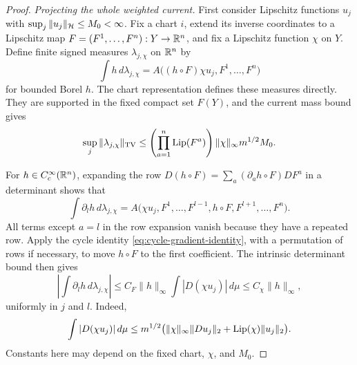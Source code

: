 \begin{proof}
\emph{Projecting the whole weighted current.}
First consider Lipschitz functions $u_j$ with
$\sup_j\|u_j\|_{\mathcal H}\le M_0<\infty$.  Fix a chart $i$, extend its
inverse coordinates to a Lipschitz map $F=(F^1,\ldots,F^n):Y\to\mathbb R^n$,
and fix a Lipschitz function $\chi$ on $Y$.  Define finite signed
measures $\lambda_{j,\chi}$ on $\mathbb R^n$ by
\begin{equation}
 \int h\,d\lambda_{j,\chi}
 =A\bigl((h\circ F)\chi u_j,F^1,\ldots,F^n\bigr)
 \label{eq:projected-function-measure}
\end{equation}
for bounded Borel $h$.  The chart representation defines these
measures directly.  They are supported in the fixed compact set
$F(Y)$, and the current mass bound gives
\[
 \sup_j\|\lambda_{j,\chi}\|_{\mathrm{TV}}
 \le \left(\prod_{a=1}^n\operatorname{Lip}(F^a)\right)
       \|\chi\|_\infty m^{1/2}M_0.
\]

For $h\in C_c^\infty(\mathbb R^n)$, expanding the row
$D(h\circ F)=\sum_a(\partial_a h\circ F)DF^a$ in a determinant shows
that
\[
 \int\partial_l h\,d\lambda_{j,\chi}
 =A\bigl(\chi u_j,F^1,\ldots,F^{l-1},h\circ F,
                         F^{l+1},\ldots,F^n\bigr).
\]
All terms except $a=l$ in the row expansion vanish because they have
a repeated row.  Apply the cycle identity
\eqref{eq:cycle-gradient-identity}, with a permutation of rows if
necessary, to move $h\circ F$ to the first coefficient.  The intrinsic
determinant bound then gives
\begin{equation}
 \left|\int\partial_lh\,d\lambda_{j,\chi}\right|
 \le C_F\|h\|_\infty\int|D(\chi u_j)|\,d\mu
 \le C_\chi\|h\|_\infty,
 \label{eq:projected-measure-derivative}
\end{equation}
uniformly in $j$ and $l$.  Indeed,
\[
 \int|D(\chi u_j)|\,d\mu
 \le m^{1/2}\bigl(\|\chi\|_\infty\|Du_j\|_2
                      +\operatorname{Lip}(\chi)\|u_j\|_2\bigr).
\]
Constants here may depend on the fixed chart, $\chi$, and $M_0$.


\end{proof}
